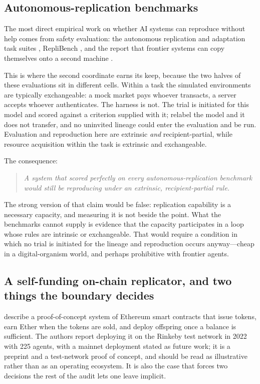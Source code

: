 \documentclass[review,3p,times]{elsarticle}
\begin{document}
\subsection{Autonomous-replication benchmarks}

The most direct empirical work on whether AI systems can reproduce without help
comes from safety evaluation: the autonomous replication and adaptation task
suites \citep{kinniment2023}, RepliBench \citep{black2025}, and the report that
frontier systems can copy themselves onto a second machine \citep{pan2024}.

This is where the second coordinate earns its keep, because the two halves of
these evaluations sit in different cells. Within a task the simulated
environments are typically exchangeable: a mock market pays whoever transacts,
a server accepts whoever authenticates. The harness is not. The trial is
initiated for this model and scored against a criterion supplied with it;
relabel the model and it does not transfer, and no uninvited lineage could
enter the evaluation and be run. Evaluation and reproduction here are extrinsic
\emph{and} recipient-partial, while resource acquisition within the task is
extrinsic and exchangeable.

The consequence:

\begin{quote}
\emph{A system that scored perfectly on every autonomous-replication
benchmark would still be reproducing under an extrinsic, recipient-partial
rule.}
\end{quote}

The strong version of that claim would be false: replication capability is a
necessary capacity, and measuring it is not beside the point. What the
benchmarks cannot supply is evidence that the capacity participates in a loop
whose rules are intrinsic or exchangeable. That would require a condition in
which no trial is initiated for the lineage and reproduction occurs
anyway---cheap in a digital-organism world, and perhaps prohibitive with
frontier agents.

\subsection{A self-funding on-chain replicator, and two things the boundary decides}

\citet{masumori2024} describe a proof-of-concept system of Ethereum smart
contracts that issue tokens, earn Ether when the tokens are sold, and
deploy offspring once a balance is sufficient. The authors report deploying
it on the Rinkeby test network in 2022 with 225 agents, with a mainnet
deployment stated as future work; it is a preprint and a test-network
proof of concept, and should be read as illustrative rather than as an
operating ecosystem. It is also the case that forces two decisions the rest
of the audit lets one leave implicit.
\end{document}
